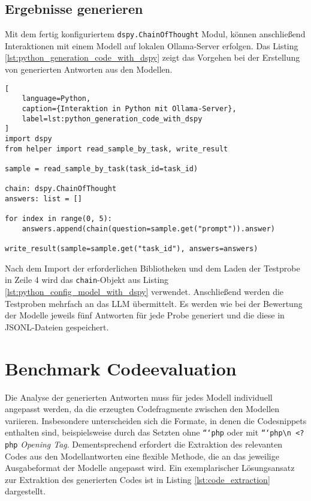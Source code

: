 \subsection{Ergebnisse generieren}
Mit dem fertig konfiguriertem \texttt{dspy.ChainOfThought} Modul, können anschließend Interaktionen mit einem Modell auf lokalen Ollama-Server erfolgen. Das Listing \ref{lst:python_generation_code_with_dspy} zeigt das Vorgehen bei der Erstellung von generierten Antworten aus den Modellen.

\begin{lstlisting}[
	language=Python,
	caption={Interaktion in Python mit Ollama-Server},
	label=lst:python_generation_code_with_dspy
]
import dspy
from helper import read_sample_by_task, write_result

sample = read_sample_by_task(task_id=task_id)

chain: dspy.ChainOfThought
answers: list = []

for index in range(0, 5):
    answers.append(chain(question=sample.get("prompt")).answer)

write_result(sample=sample.get("task_id"), answers=answers)
\end{lstlisting}

Nach dem Import der erforderlichen Bibliotheken und dem Laden der Testprobe in Zeile 4 wird das \texttt{chain}-Objekt aus Listing \ref{lst:python_config_model_with_dspy} verwendet. Anschließend werden die Testproben mehrfach an das LLM übermittelt. Es werden wie bei der Bewertung der Modelle jeweils fünf Antworten für jede Probe generiert und die diese in JSONL-Dateien gespeichert.\vspace{0.2cm}



\section{Benchmark Codeevaluation}\label{sec:benchmark_evaluation}
Die Analyse der generierten Antworten muss für jedes Modell individuell angepasst werden, da die erzeugten Codefragmente zwischen den Modellen variieren. Insbesondere unterscheiden sich die Formate, in denen die Codesnippets enthalten sind, beispielsweise durch das Setzten ohne \texttt{```php} oder mit \texttt{```php\textbackslash n <?php} \textit{Opening Tag}. Dementsprechend erfordert die Extraktion des relevanten Codes aus den Modellantworten eine flexible Methode, die an das jeweilige Ausgabeformat der Modelle angepasst wird. Ein exemplarischer Lösungsansatz zur Extraktion des generierten Codes ist in Listing \ref{lst:code_extraction} dargestellt.\vspace{0.2cm}

